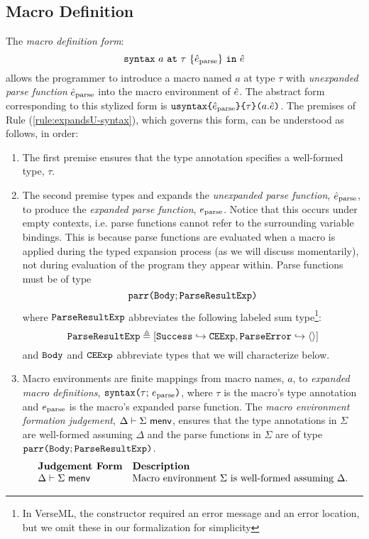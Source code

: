 \subsection{Macro Definition}
The \emph{macro definition form}: $$\texttt{syntax}~a~\texttt{at}~\tau~\{\hat{e}_\text{parse}\}~\texttt{in}~\hat{e}$$ allows the programmer to introduce a {macro} named $a$ at type $\tau$ with \emph{unexpanded parse function} $\hat{e}_\text{parse}$ into the macro environment of $\hat{e}$. The abstract form corresponding to this stylized form is $\texttt{usyntax}\texttt{\{}\hat{e}_\text{parse}\texttt{\}\{}\tau\texttt{\}(}a.\hat{e}\texttt{)}$. 
The premises of Rule (\ref{rule:expandsU-syntax}), which governs this form, can be understood as follows, in order:
\begin{enumerate}
\item The first premise ensures that the type annotation specifies a well-formed type, $\tau$.
\item The second premise types and expands the \emph{unexpanded parse function}, $\hat{e}_\text{parse}$, to produce the \emph{expanded parse function}, $e_\text{parse}$. Notice that this occurs under empty contexts, i.e. parse functions cannot refer to the surrounding variable bindings. This is because parse functions are evaluated when a macro is applied during the typed expansion process (as we will discuss momentarily), not during evaluation of the program they appear within. Parse functions must be of type \[\texttt{parr}\texttt{(}\mathtt{Body}; \mathtt{ParseResultExp}\texttt{)}\] where 
$\mathtt{ParseResultExp}$ abbreviates the following labeled sum type\footnote{In VerseML, the  constructor required an error message and an error location, but we omit these in our formalization for simplicity}:
\[
\mathtt{ParseResultExp} \triangleq [\mathtt{Success} \hookrightarrow \mathtt{CEExp}, \mathtt{ParseError} \hookrightarrow \langle  \rangle]
\] and 
 $\mathtt{Body}$ and $\mathtt{CEExp}$ abbreviate types that we will characterize below. 
\item Macro environments are finite mappings from macro names, $a$, to \emph{expanded macro definitions}, $\texttt{syntax}\texttt{(}\tau;\,e_\text{parse}\texttt{)}$, where $\tau$ is the macro's {type annotation} and $e_\text{parse}$ is the macro's {expanded parse function}. The \emph{macro environment formation judgement}, $\Delta \vdash \Sigma~\mathsf{menv}$, ensures that the type annotations in $\Sigma$ are well-formed assuming $\Delta$ and the parse functions in $\Sigma$ are  of type $\texttt{parr}\texttt{(}\mathtt{Body}; \mathtt{ParseResultExp}\texttt{)}$.
\[\begin{array}{ll}
\textbf{Judgement Form} & \textbf{Description}\\
\Delta \vdash \Sigma~\mathsf{menv} & \text{Macro environment $\Sigma$ is well-formed assuming $\Delta$.}\end{array}\]

\end{enumerate}
